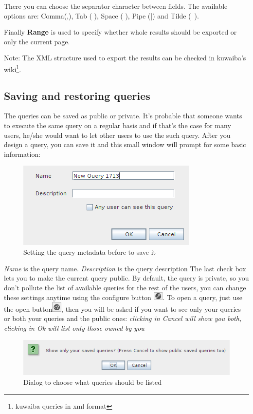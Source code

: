\documentclass[a4paper]{article}
\begin{document}
	There you can choose the separator character between fields. The available options are: Comma(,), Tab (	), Space ( ), Pipe (|) and Tilde (~).
	
	Finally \textbf{Range} is used to specify whether whole results should be exported or only the current page.
	
	Note: The XML structure used to export the results can be checked in kuwaiba's wiki\footnote{kuwaiba queries in xml format }.
	
	\subsection{Saving and restoring queries}
	The queries can be saved as public or private. It's probable that someone wants to execute the same query on a regular basis and if that's the case for many users, he/she would want to let other users to use the such query. After you design a query, you can save it and this small window will prompt for some basic information:
	\begin{figure}[h!]
		\centering
		\includegraphics[width=0.5\linewidth]{img/query_save_menu.png}
		\caption{Setting the query metadata before to save it}
		\label{fig:query_save_menu}
	\end{figure}
	
	\textit{Name} is the query name.
	\textit{Description} is the query description
	The last check box lets you to make the current query public. By default, the query is private, so you don't pollute the list of available queries for the rest of the users, you can change these settings anytime using the configure button \includegraphics[width=0.5cm]{img/icon_edit_saved_query.png}.
	To open a query, just use the open button\includegraphics[width=0.5cm]{img/icon_open.png}, then you will be asked if you want to see only your queries or both your queries and the public ones:
	\textit{clicking in Cancel will show you both, clicking in Ok will list only those owned by you}
	\begin{figure}[h!]
		\centering
		\includegraphics[width=0.7\linewidth]{img/query_save_as_private.png}
		\caption{Dialog to choose what queries should be listed}
		\label{fig:query_save_as_private}
	\end{figure}
	
\end{document}
